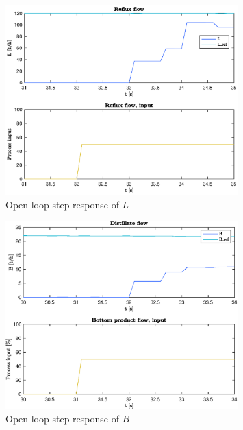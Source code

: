\documentclass[12pt]{article}
\begin{document}
\begin{figure}
\centering
\includegraphics[width=0.8\textwidth]{../Systemanalyse/Log_Data_to_Matlab/Figurer/Stegeksperimenter/FC1015.eps}
\caption{Open-loop step response of $L$}
\label{fig:ol_step_FC1015}
\end{figure}

\begin{figure}
\centering
\includegraphics[width=0.8\textwidth]{../Systemanalyse/Log_Data_to_Matlab/Figurer/Stegeksperimenter/FC1019.eps}
\caption{Open-loop step response of $B$}
\label{fig:ol_step_FC1019}
\end{figure}
\end{document}
